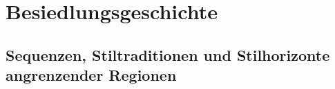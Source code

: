 \chapter{Besiedlungsgeschichte}\label{sec:BesiedlGesch}







%



%

\section{Sequenzen, Stiltraditionen und Stilhorizonte angrenzender Regionen}







%











%

%

%